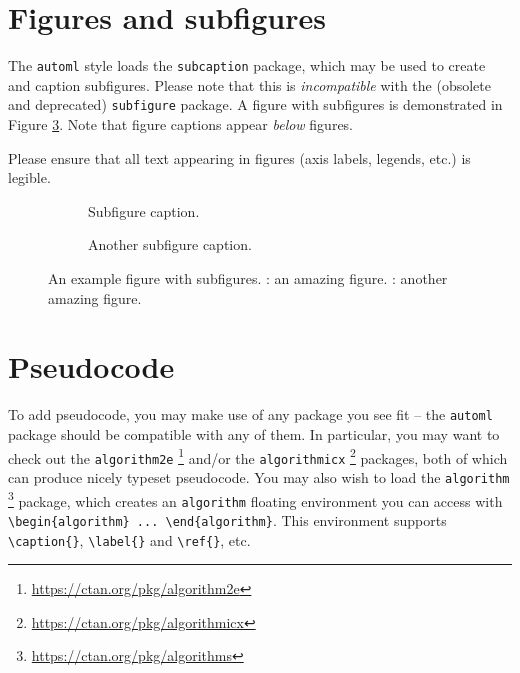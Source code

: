 \documentclass[11pt]{article}
\begin{document}
\section{Figures and subfigures}

The \texttt{automl} style loads the \texttt{subcaption} package, which may be
used to create and caption subfigures. Please note that this is
\emph{incompatible} with the (obsolete and deprecated) \texttt{subfigure}
package. A figure with subfigures is demonstrated in Figure
\ref{example_figure}. Note that figure captions appear \emph{below} figures.

Please ensure that all text appearing in figures (axis labels, legends, etc.)
is legible.

\begin{figure}
  \begin{subfigure}[t]{0.5\linewidth}
    \centering
    \caption{Subfigure caption.}
    \label{example_figure_left}
  \end{subfigure}
  \begin{subfigure}[t]{0.5\linewidth}
    \centering
    \caption{Another subfigure caption.}
    \label{example_figure_right}
  \end{subfigure}
  \caption{An example figure with subfigures. : an
    amazing figure. : another amazing figure.}
  \label{example_figure}
\end{figure}

\section{Pseudocode}
\label{sec:code}

To add pseudocode, you may make use of any package you see fit -- the
\texttt{automl} package should be compatible with any of them. In particular,
you may want to check out the \texttt{algorithm2e}%
%
\footnote{\url{https://ctan.org/pkg/algorithm2e}}
%
and/or the \texttt{algorithmicx}%
%
\footnote{\url{https://ctan.org/pkg/algorithmicx}}
%
packages, both of which can produce nicely typeset pseudocode. You may also wish
to load the \texttt{algorithm}%
%
\footnote{\url{https://ctan.org/pkg/algorithms}}
%
package, which creates an \texttt{algorithm} floating environment you can access
with \verb|\begin{algorithm} ... \end{algorithm}|. This environment supports
\verb|\caption{}|, \verb|\label{}| and \verb|\ref{}|, etc.
\end{document}
